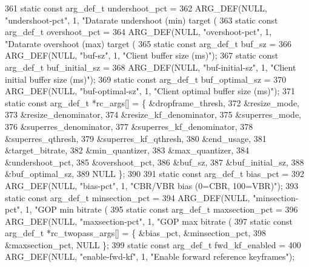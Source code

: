 \begin{DoxyCodeInclude}
{{{361 \textcolor{keyword}{static} \textcolor{keyword}{const} arg\_def\_t undershoot\_pct =
362     ARG\_DEF(NULL, \textcolor{stringliteral}{"undershoot-pct"}, 1, \textcolor{stringliteral}{"Datarate undershoot (min) target (%
363 \textcolor{keyword}{static} \textcolor{keyword}{const} arg\_def\_t overshoot\_pct =
364     ARG\_DEF(NULL, \textcolor{stringliteral}{"overshoot-pct"}, 1, \textcolor{stringliteral}{"Datarate overshoot (max) target (%
365 \textcolor{keyword}{static} \textcolor{keyword}{const} arg\_def\_t buf\_sz =
366     ARG\_DEF(NULL, \textcolor{stringliteral}{"buf-sz"}, 1, \textcolor{stringliteral}{"Client buffer size (ms)"});
367 \textcolor{keyword}{static} \textcolor{keyword}{const} arg\_def\_t buf\_initial\_sz =
368     ARG\_DEF(NULL, \textcolor{stringliteral}{"buf-initial-sz"}, 1, \textcolor{stringliteral}{"Client initial buffer size (ms)"});
369 \textcolor{keyword}{static} \textcolor{keyword}{const} arg\_def\_t buf\_optimal\_sz =
370     ARG\_DEF(NULL, \textcolor{stringliteral}{"buf-optimal-sz"}, 1, \textcolor{stringliteral}{"Client optimal buffer size (ms)"});
371 \textcolor{keyword}{static} \textcolor{keyword}{const} arg\_def\_t *rc\_args[] = \{ &dropframe\_thresh,
372     &resize\_mode,
373     &resize\_denominator,
374     &resize\_kf\_denominator,
375     &superres\_mode,
376     &superres\_denominator,
377     &superres\_kf\_denominator,
378     &superres\_qthresh,
379     &superres\_kf\_qthresh,
380     &end\_usage,
381     &target\_bitrate,
382     &min\_quantizer,
383     &max\_quantizer,
384     &undershoot\_pct,
385     &overshoot\_pct,
386     &buf\_sz,
387     &buf\_initial\_sz,
388     &buf\_optimal\_sz,
389     NULL \};
390 
391 \textcolor{keyword}{static} \textcolor{keyword}{const} arg\_def\_t bias\_pct =
392     ARG\_DEF(NULL, \textcolor{stringliteral}{"bias-pct"}, 1, \textcolor{stringliteral}{"CBR/VBR bias (0=CBR, 100=VBR)"});
393 \textcolor{keyword}{static} \textcolor{keyword}{const} arg\_def\_t minsection\_pct =
394     ARG\_DEF(NULL, \textcolor{stringliteral}{"minsection-pct"}, 1, \textcolor{stringliteral}{"GOP min bitrate (%
395 \textcolor{keyword}{static} \textcolor{keyword}{const} arg\_def\_t maxsection\_pct =
396     ARG\_DEF(NULL, \textcolor{stringliteral}{"maxsection-pct"}, 1, \textcolor{stringliteral}{"GOP max bitrate (%
397 \textcolor{keyword}{static} \textcolor{keyword}{const} arg\_def\_t *rc\_twopass\_args[] = \{ &bias\_pct, &minsection\_pct,
398     &maxsection\_pct, NULL \};
399 \textcolor{keyword}{static} \textcolor{keyword}{const} arg\_def\_t fwd\_kf\_enabled =
400     ARG\_DEF(NULL, \textcolor{stringliteral}{"enable-fwd-kf"}, 1, \textcolor{stringliteral}{"Enable forward reference keyframes"});
}}}}}}}
\end{DoxyCodeInclude}
